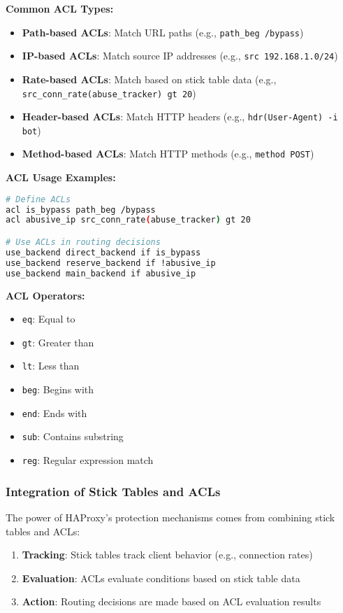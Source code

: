 \documentclass[12pt]{article}
\begin{document}
\textbf{Common ACL Types:}
\begin{itemize}
    \item \textbf{Path-based ACLs}: Match URL paths (e.g., \texttt{path\_beg /bypass})
    \item \textbf{IP-based ACLs}: Match source IP addresses (e.g., \texttt{src 192.168.1.0/24})
    \item \textbf{Rate-based ACLs}: Match based on stick table data (e.g., \texttt{src\_conn\_rate(abuse\_tracker) gt 20})
    \item \textbf{Header-based ACLs}: Match HTTP headers (e.g., \texttt{hdr(User-Agent) -i bot})
    \item \textbf{Method-based ACLs}: Match HTTP methods (e.g., \texttt{method POST})
\end{itemize}

\textbf{ACL Usage Examples:}
\begin{lstlisting}[language=bash]
# Define ACLs
acl is_bypass path_beg /bypass
acl abusive_ip src_conn_rate(abuse_tracker) gt 20

# Use ACLs in routing decisions
use_backend direct_backend if is_bypass
use_backend reserve_backend if !abusive_ip
use_backend main_backend if abusive_ip
\end{lstlisting}

\textbf{ACL Operators:}
\begin{itemize}
    \item \texttt{eq}: Equal to
    \item \texttt{gt}: Greater than
    \item \texttt{lt}: Less than
    \item \texttt{beg}: Begins with
    \item \texttt{end}: Ends with
    \item \texttt{sub}: Contains substring
    \item \texttt{reg}: Regular expression match
\end{itemize}

\subsubsection{Integration of Stick Tables and ACLs}
The power of HAProxy's protection mechanisms comes from combining stick tables and ACLs:

\begin{enumerate}
    \item \textbf{Tracking}: Stick tables track client behavior (e.g., connection rates)
    \item \textbf{Evaluation}: ACLs evaluate conditions based on stick table data
    \item \textbf{Action}: Routing decisions are made based on ACL evaluation results
\end{enumerate}
\end{document}
